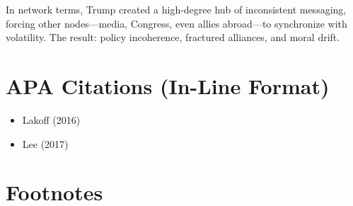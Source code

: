 In network terms, Trump created a high-degree hub of inconsistent
messaging, forcing other nodes---media, Congress, even allies
abroad---to synchronize with volatility. The result: policy incoherence,
fractured alliances, and moral drift.

\section*{APA Citations (In-Line Format)}

\begin{itemize}
\tightlist
\item
  Lakoff (2016)
\item
  Lee (2017)
\end{itemize}

\section*{Footnotes}
